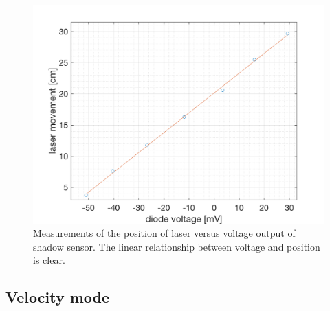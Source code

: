\documentclass[english,a4paper,12pt,reprint]{revtex4-1}
\begin{document}
\begin{figure}[htpb]
  \centering
  \includegraphics[scale=0.45]{laser_data.png}
  \caption{Measurements of the position of laser versus voltage output of shadow sensor. The linear relationship between voltage and position is clear.}
  \label{fig:result_shadow_sens}
\end{figure}

\subsection{Velocity mode}
\end{document}
